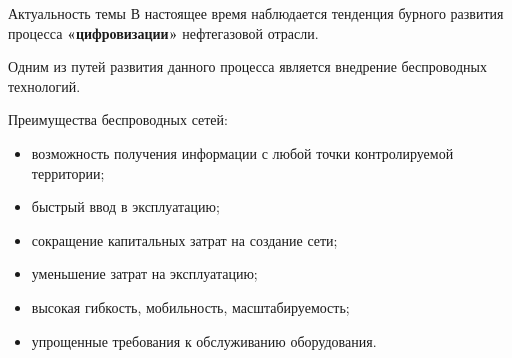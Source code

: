 \begin{frame}
    {Актуальность темы}
    \justifying
    В настоящее время наблюдается тенденция бурного развития процесса \textbf{«цифровизации»} нефтегазовой отрасли.
    
    \bigskip

    Одним из путей развития данного процесса является внедрение беспроводных технологий.
    \bigskip

    Преимущества беспроводных сетей:
    \begin{itemize}
        \item возможность получения информации с любой точки контролируемой территории;
        \item быстрый ввод в эксплуатацию;
        \item сокращение капитальных затрат на создание сети; 
        \item уменьшение затрат на эксплуатацию;
        \item высокая гибкость, мобильность, масштабируемость;
        \item упрощенные требования к обслуживанию оборудования.
    \end{itemize}

    
\end{frame}


